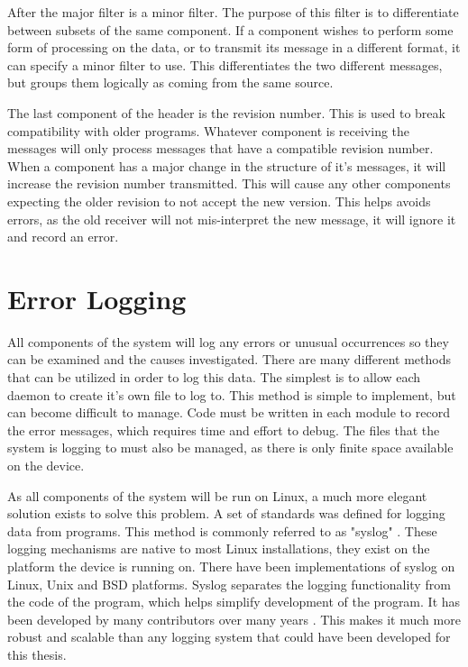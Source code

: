 After the major filter is a minor filter. The purpose of this filter is to differentiate between subsets of the same component. If a component wishes to perform some form of processing on the data, or to transmit its message in a different format, it can specify a minor filter to use. This differentiates the two different messages, but groups them logically as coming from the same source.

The last component of the header is the revision number. This is used to break compatibility with older programs. Whatever component is receiving the messages will only process messages that have a compatible revision number. When a component has a major change in the structure of it's messages, it will increase the revision number transmitted. This will cause any other components expecting the older revision to not accept the new version. This helps avoids errors, as the old receiver will not mis-interpret the new message, it will ignore it and record an error.


\section{Error Logging}
\label{sec:dmesglogging}

All components of the system will log any errors or unusual occurrences so they can be examined and the causes investigated. There are many different methods that can be utilized in order to log this data. The simplest is to allow each daemon to create it's own file to log to. This method is simple to implement, but can become difficult to manage. Code must be written in each module to record the error messages, which requires time and effort to debug. The files that the system is logging to must also be managed, as there is only finite space available on the device.

As all components of the system will be run on Linux, a much more elegant solution exists to solve this problem. A set of standards was defined for logging data from programs. This method is commonly referred to as "syslog" \cite{syslog}. These logging mechanisms are native to most Linux installations, they exist on the platform the device is running on. There have been implementations of syslog on Linux, Unix and BSD platforms. Syslog separates the logging functionality from the code of the program, which helps simplify development of the program. It has been developed by many contributors over many years \cite{syslog}. This makes it much more robust and scalable than any logging system that could have been developed for this thesis.

